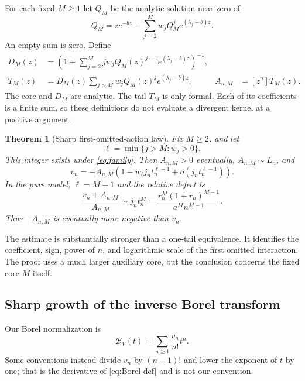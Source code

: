 \documentclass[11pt,a4paper]{article}
\numberwithin{equation}{section}
\newtheorem{theorem}{Theorem}[section]
\theoremstyle{definition}
\theoremstyle{remark}
\newcommand{\Bcal}{\mathcal B}\newcommand{\Ccal}{\mathcal C}
\begin{document}
For each fixed $M\ge1$ let $Q_M$ be the analytic solution near zero of
\begin{equation}
 Q_M=z e^{-bz}-\sum_{j=2}^{M}w_jQ_M^j e^{(\lambda_j-b)z}.
 \label{eq:inverse-core}
\end{equation}
An empty sum is zero. Define
\begin{align}
 D_M(z)&=\left(1+\sum_{j=2}^{M}j w_jQ_M(z)^{j-1}
                       e^{(\lambda_j-b)z}\right)^{-1},\label{eq:responseD}\\
 T_M(z)&=D_M(z)\sum_{j>M}w_jQ_M(z)^j e^{(\lambda_j-b)z},
 &A_{n,M}&=[z^n]T_M(z).
 \label{eq:responseT}
\end{align}
The core and $D_M$ are analytic. The tail $T_M$ is only formal. Each of
its coefficients is a finite sum, so these definitions do not evaluate a
divergent kernel at a positive argument.

\begin{theorem}[Sharp first-omitted-action law]
\label{thm:sharp}
Fix $M\ge2$, and let
\[
 \ell=\min\{j>M:w_j>0\}.
\]
This integer exists under \eqref{eq:family}. Then $A_{n,M}>0$ eventually,
$A_{n,M}\sim L_n$, and
\begin{equation}
 \boxed{\quad
 v_n=-A_{n,M}\left(1-w_\ell j_n t_n^{\ell-1}
                       +o(j_n t_n^{\ell-1})\right).
 \quad}
 \label{eq:sharp}
\end{equation}
In the pure model, $\ell=M+1$ and the relative defect is
\begin{equation}
 \frac{v_n+A_{n,M}}{A_{n,M}}
 \sim j_n t_n^M
 =\frac{r_n^M(1+r_n)^{M-1}}{a^M n^{M-1}}.
 \label{eq:pure-defect}
\end{equation}
Thus $-A_{n,M}$ is eventually more negative than $v_n$.
\end{theorem}

The estimate is substantially stronger than a one-tail equivalence. It
identifies the coefficient, sign, power of $n$, and logarithmic scale of
the first omitted interaction. The proof uses a much larger auxiliary
core, but the conclusion concerns the fixed core $M$ itself.

\subsection{Sharp growth of the inverse Borel transform}

Our Borel normalization is
\begin{equation}
 \Bcal_V(t)=\sum_{n\ge1}\frac{v_n}{n!}t^n.
 \label{eq:Borel-def}
\end{equation}
Some conventions instead divide $v_n$ by $(n-1)!$ and lower the exponent
of $t$ by one; that is the derivative of \eqref{eq:Borel-def} and is not
our convention.
\end{document}
